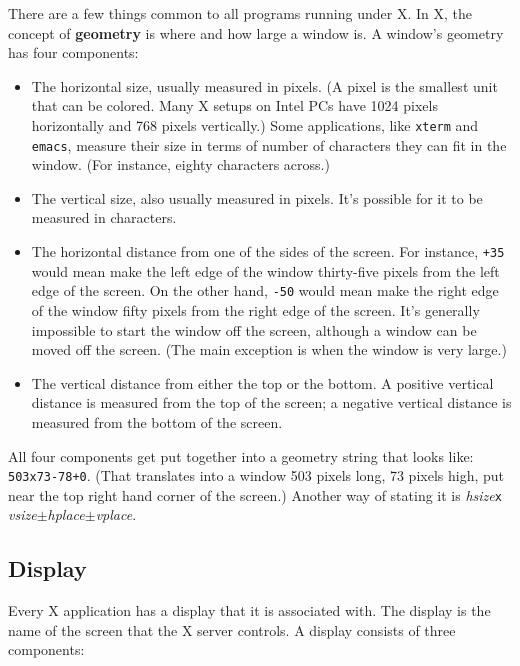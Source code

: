 There are a few things common to all programs running under X.  In X, the
concept of {\bf geometry} is where and how large a window is.  A
window's geometry has four components:
\begin{itemize}
\item The horizontal size, usually measured in pixels. (A pixel is the
  smallest unit that can be colored. Many X setups on Intel PCs have
  1024 pixels horizontally and 768 pixels vertically.) Some
  applications, like {\tt xterm} and {\tt emacs}, measure their size in
  terms of number of characters they can fit in the window. (For
  instance, eighty characters across.)
\item The vertical size, also usually measured in pixels. It's
  possible for it to be measured in characters.
\item The horizontal distance from one of the sides of the screen. For
  instance, {\tt +35} would mean make the left edge of the window
  thirty-five pixels from the left edge of the screen. On the other
  hand, {\tt -50} would mean make the right edge of the window fifty
  pixels from the right edge of the screen.  It's generally impossible to start
  the window off the screen, although a window can be moved off the
  screen.  (The main exception is when the window is very large.)
\item The vertical distance from either the top or the bottom. A
  positive vertical distance is measured from the top of the screen; a
  negative vertical distance is measured from the bottom of the
  screen.
\end{itemize}

All four components get put together into a geometry string that looks
like: {\tt 503x73-78+0}. (That translates into a window 503 pixels
long, 73 pixels high, put near the top right hand corner of the
screen.)  Another way of stating it is {\sl hsize\/}{\tt x}{\sl
  vsize\/}$\pm${\sl hplace\/}$\pm${\sl vplace\/}.

\subsection{Display}

Every X application has a display that it is associated with.  The
display is the name of the screen that the X server controls.  A
display consists of three components:

